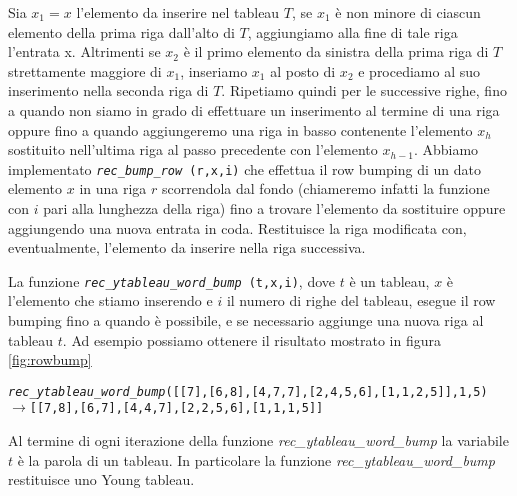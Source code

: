 Sia $x_1 = x$ l'elemento da inserire nel tableau $T$, se $x_1$ \`e non 
minore di ciascun elemento della prima riga
dall'alto di $T$, aggiungiamo alla fine di tale riga l'entrata x.
Altrimenti se $x_2$ \`e il primo elemento da sinistra della prima riga
di $T$ strettamente maggiore di $x_1$, inseriamo $x_1$ al posto di
$x_2$ e procediamo al suo inserimento nella seconda riga di $T$.
Ripetiamo quindi per le successive righe, fino a quando non siamo in
grado di effettuare un inserimento al termine di una riga oppure fino
a quando aggiungeremo una riga in basso contenente l'elemento $x_h$
sostituito nell'ultima riga al passo precedente con l'elemento
$x_{h-1}$.
Abbiamo implementato \texttt{\emph{rec\_bump\_row} (r,x,i)} che effettua il row bumping di un dato
elemento $x$ in una riga $r$ scorrendola dal fondo (chiameremo infatti
la funzione con $i$ pari alla lunghezza della riga) fino a trovare
l'elemento da sostituire oppure aggiungendo una nuova entrata in coda.
Restituisce la riga modificata con, eventualmente, l'elemento da
inserire nella riga successiva.

La funzione \texttt{\emph{rec\_ytableau\_word\_bump} (t,x,i)}, dove
$t$ \`e un tableau, $x$ \`e l'elemento che stiamo inserendo e $i$ il
numero di righe del tableau, esegue il row bumping
fino a quando \`e possibile, e se necessario aggiunge una nuova riga
al tableau $t$. Ad esempio possiamo ottenere il risultato mostrato in
figura \ref{fig:rowbump}

\begin{alltt}
\emph{rec\_ytableau\_word\_bump} ([[7],[6,8],[4,7,7],[2,4,5,6],[1,1,2,5]], 1, 5)
\(\rightarrow\) [[7,8],[6,7],[4,4,7],[2,2,5,6],[1,1,1,5]]
\end{alltt}

\begin{oss}
Al termine di ogni iterazione della funzione
\emph{rec\_ytableau\_word\_bump} la variabile $t$ \`e la parola di un
tableau. In particolare la funzione \emph{rec\_ytableau\_word\_bump}
restituisce uno Young tableau.
\end{oss}

